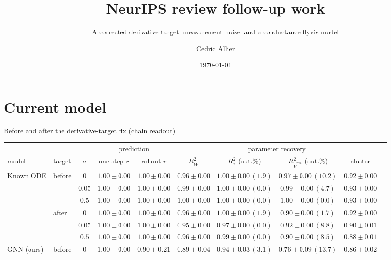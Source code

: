 \documentclass[aspectratio=169]{beamer}
\title{NeurIPS review follow-up work}
\subtitle{A corrected derivative target, measurement noise, and a conductance flyvis model}
\author{Cedric Allier}
\institute{Saalfeld lab, Janelia}
\date{\today}
\newcommand{\good}[1]{\textcolor{goodgreen}{#1}}
\begin{document}
\frame{\titlepage}

\section{Current model}
\begin{frame}{Before and after the derivative-target fix \textnormal{\small(chain readout)}}
\label{sl:beforeafter}
\vspace{0.2cm}
\centering\tiny
\setlength{\tabcolsep}{3.5pt}
\begin{tabular}{llcccccccc}
\toprule
 & & & \multicolumn{2}{c}{prediction} & \multicolumn{4}{c}{parameter recovery} \\
\cmidrule(lr){4-5}\cmidrule(lr){6-9}
model & target & $\sigma$ & one-step $r$ & rollout $r$
  & $R^2_{\hat W}$ & $R^2_{\hat\tau}$ (out.\%) & $R^2_{\hat V^{\mathrm{rest}}}$ (out.\%)
  & cluster \\
\midrule
Known ODE & before & $0$    & \good{$1.00{\pm}0.00$} & \good{$1.00{\pm}0.00$} & \good{$0.96{\pm}0.00$} & \good{$1.00{\pm}0.00\,(1.9)$} & \good{$0.97{\pm}0.00\,(10.2)$} & \good{$0.92{\pm}0.00$} \\
          &        & $0.05$ & \good{$1.00{\pm}0.00$} & \good{$1.00{\pm}0.00$} & \good{$0.99{\pm}0.00$} & \good{$1.00{\pm}0.00\,(0.0)$} & \good{$0.99{\pm}0.00\,(4.7)$}  & \good{$0.93{\pm}0.00$} \\
          &        & $0.5$  & \good{$1.00{\pm}0.00$} & \good{$1.00{\pm}0.00$} & \good{$1.00{\pm}0.00$} & \good{$1.00{\pm}0.00\,(0.0)$} & \good{$1.00{\pm}0.00\,(0.0)$}  & \good{$0.93{\pm}0.00$} \\
\cmidrule(lr){2-9}
          & after  & $0$    & \good{$1.00{\pm}0.00$} & \good{$1.00{\pm}0.00$} & \good{$0.96{\pm}0.00$} & \good{$1.00{\pm}0.00\,(1.9)$} & $0.90{\pm}0.00\,(1.7)$ & \good{$0.92{\pm}0.00$} \\
          &        & $0.05$ & \good{$1.00{\pm}0.00$} & \good{$1.00{\pm}0.00$} & \good{$0.95{\pm}0.00$} & \good{$0.97{\pm}0.00\,(0.0)$} & \good{$0.92{\pm}0.00\,(8.8)$} & \good{$0.90{\pm}0.01$} \\
          &        & $0.5$  & \good{$1.00{\pm}0.00$} & \good{$1.00{\pm}0.00$} & \good{$0.96{\pm}0.00$} & \good{$0.99{\pm}0.00\,(0.0)$} & $0.90{\pm}0.00\,(8.5)$ & $0.88{\pm}0.01$ \\
\midrule
GNN (ours) & before & $0$    & \good{$1.00{\pm}0.00$} & $0.90{\pm}0.21$ & $0.89{\pm}0.04$ & \good{$0.94{\pm}0.03\,(3.1)$} & $0.76{\pm}0.09\,(13.7)$ & $0.86{\pm}0.02$ \\

\end{tabular}
\end{frame}
\end{document}
